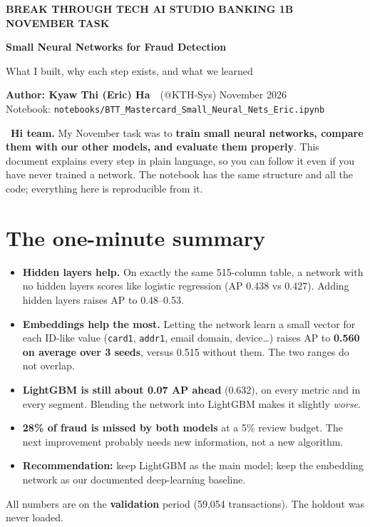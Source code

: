 \documentclass[11pt]{article}
\newcommand{\note}[2][panel]{\par\noindent\colorbox{#1}{\parbox{\dimexpr\linewidth-2\fboxsep}{\vspace{4pt}#2\vspace{4pt}}}\par}
\newcommand{\eric}{{\color{emerald}\bfseries[Eric]}}
\begin{document}
{\color{emerald}\small\bfseries BREAK THROUGH TECH AI STUDIO \textperiodcentered{} BANKING 1B \textperiodcentered{} NOVEMBER TASK}\\[6pt]
{\raggedright\color{ink}\fontsize{24}{28}\selectfont\bfseries Small Neural Networks for Fraud Detection\par}
\vspace{4pt}
{\large\color{muted} What I built, why each step exists, and what we learned\par}
\vspace{8pt}
{\color{ink}\bfseries Author: Kyaw Thi (Eric) Ha}\ \ {\color{muted}(@KTH-Sys) \textperiodcentered{} November 2026}\\
{\small\color{muted}Notebook: \nolinkurl{notebooks/BTT_Mastercard_Small_Neural_Nets_Eric.ipynb}}

\vspace{6pt}
\note{\eric\ \textbf{Hi team.} My November task was to \textbf{train small neural networks, compare them with our other models, and evaluate them properly}. This document explains every step in plain language, so you can follow it even if you have never trained a network. The notebook has the same structure and all the code; everything here is reproducible from it.}

\section*{The one-minute summary}
\begin{itemize}
\item \textbf{Hidden layers help.} On exactly the same 515-column table, a network with no hidden layers scores like logistic regression (AP 0.438 vs 0.427). Adding hidden layers raises AP to 0.48--0.53.
\item \textbf{Embeddings help the most.} Letting the network learn a small vector for each ID-like value (\texttt{card1}, \texttt{addr1}, email domain, device\ldots) raises AP to \textbf{0.560 on average over 3 seeds}, versus 0.515 without them. The two ranges do not overlap.
\item \textbf{LightGBM is still about 0.07 AP ahead} (0.632), on every metric and in every segment. Blending the network into LightGBM makes it slightly \emph{worse}.
\item \textbf{28\% of fraud is missed by both models} at a 5\% review budget. The next improvement probably needs new information, not a new algorithm.
\item \textbf{Recommendation:} keep LightGBM as the main model; keep the embedding network as our documented deep-learning baseline.
\end{itemize}
All numbers are on the \textbf{validation} period (59,054 transactions). The holdout was never loaded.
\end{document}
